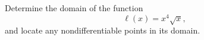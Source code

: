 Determine the domain of the function
\begin{equation*}
  \ell(x) = x^4\sqrt{x},
\end{equation*}
and locate any nondifferentiable points in its domain.
